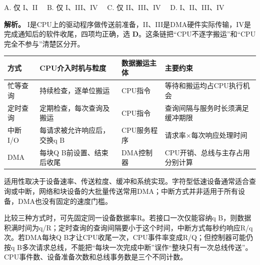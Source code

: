 A. 仅 I、II　 B. 仅 I、III、IV　 C. 仅 II、III、IV　 D. I、II、III、IV

\textbf{解析。} I是CPU上的驱动程序做传送前准备，II、III是DMA硬件实际传输，IV是完成通知后的软件收尾，四项均正确，选 \textbf{D}。这条链把``CPU不逐字搬运''和``CPU完全不参与''清楚区分开。

\begin{wideblock}

\par\medskip\noindent\begin{minipage}{\linewidth}\fontsize{9.3}{12}\selectfont\begin{tabularx}{\linewidth}{@{}YYYY@{}}
\toprule\noalign{}
\begin{minipage}[b]{\linewidth}\raggedright
方式
\end{minipage} & \begin{minipage}[b]{\linewidth}\raggedright
CPU介入时机与粒度
\end{minipage} & \begin{minipage}[b]{\linewidth}\raggedright
数据搬运主体
\end{minipage} & \begin{minipage}[b]{\linewidth}\raggedright
主要约束
\end{minipage} \\
\midrule\noalign{}


忙等查询 & 持续检查，逐单位搬运 & CPU指令 & 等待和搬运均占CPU执行机会 \\
定时查询 & 定期检查，每次查询及搬运 & CPU指令 & 查询间隔与服务时长须满足缓冲期限 \\
中断I/O & 每请求被允许响应后，交换q B & CPU服务程序 & 请求率\ensuremath{\times}每次响应处理时间 \\
DMA & 每块Q B前设置、结束后收尾 & DMA控制器 & CPU开销、总线与主存占用分别计算 \\
\bottomrule\end{tabularx}
\end{minipage}\par\medskip

\end{wideblock}

适用性取决于设备速率、传送粒度、缓冲和系统实现。字符型低速设备通常适合查询或中断，网络和块设备的大批量传送常用DMA；中断方式并非适用于所有设备，DMA也没有固定的速度门槛。

比较三种方式时，可先固定同一设备数据率R。若接口一次仅能容纳q B，则数据积满时间为q/R；定时查询的查询间隔要小于这个时间，中断方式每秒约响应R/q次。若DMA每块Q B才让CPU收尾一次，CPU事件率变成R/Q；但控制器可能仍按q B多次请求总线，不能把``每块一次完成中断''误作``整块只有一次总线传送''。CPU事件数、设备准备次数和总线事务数是三个不同计数。

